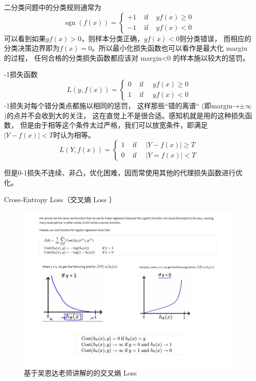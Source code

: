  \noindent  二分类问题中的分类规则通常为
 \begin{equation}\label{loss:6}
	\operatorname{sgn}(f(x))=\left\{\begin{array}{lll}
	+1 & \text { if } & y f(x) \geq 0 \\
	-1 & \text { if } & y f(x)<0
	\end{array}\right.
	\end{equation}
\noindent  可以看到如果$yf(x)>0$，则样本分类正确，$yf(x)<0$则分类错误，
而相应的分类决策边界即为$f(x)=0$。所以最小化损失函数也可以看作是最大化 margin 的过程，
任何合格的分类损失函数都应该对 margin<0 的样本施以较大的惩罚。



\begin{outline}
	-1损失函数
	\begin{equation}\label{loss:7}
		L(y, f(x))=\left\{\begin{array}{lll}
		0 & \text { if } \quad yf(x) \geq 0 \\
		1 & \text { if } \quad y f(x)<0
		\end{array}\right.
		\end{equation}
		-1损失对每个错分类点都施以相同的惩罚，
		这样那些“错的离谱“ (即margin→$\pm\infty $)的点并不会收到大的关注，
		这在直觉上不是很合适。感知机就是用的这种损失函数，
		但是由于相等这个条件太过严格，我们可以放宽条件，即满足 $|Y−f(x)|<T$时认为相等。
		\begin{equation}\label{loss:8}
			L(Y, f(x))=\left\{\begin{array}{lll}
			1 &\text { if } \quad |Y-f(x)| \geq T \\
			0 &\text { if } \quad |Y=f(x)|<T
			\end{array}\right.
			\end{equation}

		\2 但是0-1损失不连续、非凸，优化困难，因而常使用其他的代理损失函数进行优化。

   \1 Cross-Entropy Loss（交叉熵 Loss ）
	\begin{figure}[h!]%
    \centering
    \includegraphics[scale=0.7]{figs/2.png} 
    \caption{基于吴恩达老师讲解的的交叉熵 Loss}
	\label{fig:cross}
 \end{figure}



\end{outline}
